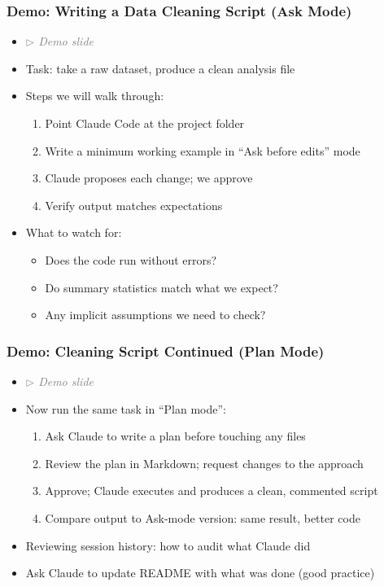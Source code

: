 \documentclass[aspectratio=169, 12pt]{beamer}
\begin{document}
\begin{frame}
\frametitle{Demo: Writing a Data Cleaning Script (Ask Mode)}

\begin{itemize}
    \item \textcolor{gray}{\textit{$\triangleright$ Demo slide}}
    \item Task: take a raw dataset, produce a clean analysis file
    \item Steps we will walk through:
        \begin{enumerate}
            \item Point Claude Code at the project folder
            \item Write a minimum working example in ``Ask before edits'' mode
            \item Claude proposes each change; we approve
            \item Verify output matches expectations
        \end{enumerate}
    \item What to watch for:
        \begin{itemize}
            \item[$\circ$] Does the code run without errors?
            \item[$\circ$] Do summary statistics match what we expect?
            \item[$\circ$] Any implicit assumptions we need to check?
        \end{itemize}
\end{itemize}

\end{frame}


\begin{frame}
\frametitle{Demo: Cleaning Script Continued (Plan Mode)}

\begin{itemize}
    \item \textcolor{gray}{\textit{$\triangleright$ Demo slide}}
    \item Now run the same task in ``Plan mode'':
        \begin{enumerate}
            \item Ask Claude to write a plan before touching any files
            \item Review the plan in Markdown; request changes to the approach
            \item Approve; Claude executes and produces a clean, commented script
            \item Compare output to Ask-mode version: same result, better code
        \end{enumerate}
    \item Reviewing session history: how to audit what Claude did
    \item Ask Claude to update README with what was done (good practice)
\end{itemize}

\end{frame}
\end{document}
